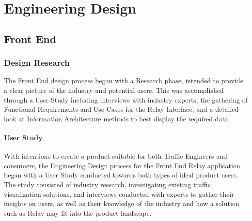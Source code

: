 \documentclass{report}
\begin{document}
\newpage

\chapter{Engineering Design}

\section{Front End}

\subsection{Design Research}
The Front End design process began with a Research phase, intended to provide a clear picture of the industry and potential users.
This was accomplished through a User Study including interviews with industry experts, the gathering of Functional Requirements and Use Cases for the Relay Interface, and a detailed look at Information Architecture methods to best display the required data.

\subsubsection{User Study}
With intentions to create a product suitable for both Traffic Engineers and consumers, the Engineering Design process for the Front End Relay application began with a User Study conducted towards both types of ideal product users.
The study consisted of industry research, investigating existing traffic visualization solutions, and interviews conducted with experts to gather their insights on users, as well as their knowledge of the industry and how a solution such as Relay may fit into the product landscape. 
\end{document}
